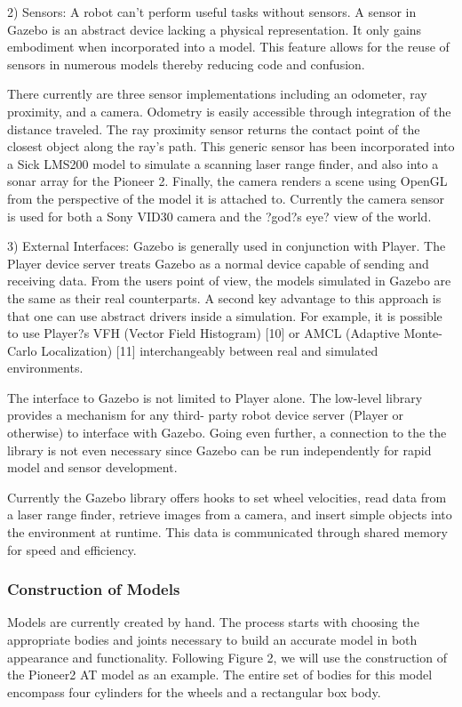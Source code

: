 2) Sensors: A robot can't perform useful tasks without sensors. A sensor in Gazebo is an abstract device lacking a physical representation. It only gains embodiment when incorporated into a model. This feature allows for the reuse of sensors in numerous models thereby reducing code and confusion.

There currently are three sensor implementations including an odometer, ray proximity, and a camera. Odometry is easily accessible through integration of the distance traveled. The ray proximity sensor returns the contact point of the closest object along the ray's path. This generic sensor has been incorporated into a Sick LMS200 model to simulate a scanning laser range finder, and also into a sonar array for the Pioneer 2. Finally, the camera renders a scene using OpenGL from the perspective of the model it is attached to. Currently the camera sensor is used for both a Sony VID30 camera and the ?god?s eye? view of the world.

3) External Interfaces: Gazebo is generally used in conjunction with Player. The Player device server treats Gazebo as a normal device capable of sending and receiving data. From the users point of view, the models simulated in Gazebo are the same as their real counterparts. A second key advantage to this approach is that one can use abstract drivers inside a simulation. For example, it is possible to use Player?s VFH (Vector Field Histogram) [10] or AMCL (Adaptive Monte-Carlo Localization) [11] interchangeably between real and simulated environments.

The interface to Gazebo is not limited to Player alone. The low-level library provides a mechanism for any third- party robot device server (Player or otherwise) to interface with Gazebo. Going even further, a connection to the the library is not even necessary since Gazebo can be run independently for rapid model and sensor development.

Currently the Gazebo library offers hooks to set wheel velocities, read data from a laser range finder, retrieve images from a camera, and insert simple objects into the environment at runtime. This data is communicated through shared memory for speed and efficiency.

\subsubsection{Construction of Models}

Models are currently created by hand. The process starts with choosing the appropriate bodies and joints necessary to build an accurate model in both appearance and functionality. Following Figure 2, we will use the construction of the Pioneer2 AT model as an example. The entire set of bodies for this model encompass four cylinders for the wheels and a rectangular box body.

